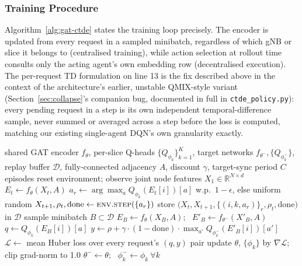 \documentclass[journal]{IEEEtran}
\begin{document}
\subsubsection{Training Procedure}
Algorithm~\ref{alg:gat-ctde} states the training loop precisely. The
encoder is updated from every request in a sampled minibatch, regardless
of which gNB or slice it belongs to (centralised training), while
action selection at rollout time consults only the acting agent's own
embedding row (decentralised execution). The per-request TD
formulation on line 13 is the fix described above in the context of the
architecture's earlier, unstable QMIX-style variant
(Section~\ref{sec:collapse}'s companion bug, documented in full in
\texttt{ctde\_policy.py}): every pending request in a step is its own
independent temporal-difference sample, never summed or averaged across
a step before the loss is computed, matching our existing single-agent
DQN's own granularity exactly.

\begin{algorithm}[t]
\caption{GAT-CTDE: centralised training, decentralised execution}
\label{alg:gat-ctde}
\begin{algorithmic}[1]
\REQUIRE shared GAT encoder $f_\theta$, per-slice Q-heads $\{Q_{\phi_k}\}_{k=1}^{K}$, target networks $f_{\theta^-}, \{Q_{\phi_k^-}\}$, replay buffer $\mathcal{D}$, fully-connected adjacency $A$, discount $\gamma$, target-sync period $C$ episodes
  \STATE reset environment; observe joint node features $X_1 \in \mathbb{R}^{N \times d}$
    \STATE $E_t \gets f_\theta(X_t, A)$ 
      \STATE $a_r \gets \arg\max_a Q_{\phi_k}(E_t[i])[a]$ w.p.\ $1{-}\epsilon$, else uniform random 
    \ENDFOR
    \STATE $X_{t+1}, \rho_t, \text{done} \gets \textsc{env.step}(\{a_r\})$
    \STATE store $\big(X_t, X_{t+1}, \{(i,k,a_r)\}_r, \rho_t, \text{done}\big)$ in $\mathcal{D}$
      \STATE sample minibatch $B \subset \mathcal{D}$
      \STATE $E_B \gets f_\theta(X_B, A)$; \ $E'_B \gets f_{\theta^-}(X'_B, A)$ 
        \STATE $q \gets Q_{\phi_k}(E_B[i])[a]$
        \STATE $y \gets \rho + \gamma \cdot (1{-}\text{done}) \cdot \max_{a'} Q_{\phi_k^-}(E'_B[i])[a']$
      \ENDFOR
      \STATE $\mathcal{L} \gets$ mean Huber loss over every request's $(q, y)$ pair 
      \STATE update $\theta$, $\{\phi_k\}$ by $\nabla \mathcal{L}$; clip grad-norm to 1.0
    \ENDIF
  \ENDFOR
    \STATE $\theta^- \gets \theta$; \ $\phi_k^- \gets \phi_k\ \forall k$
  \ENDIF
\ENDFOR
\end{algorithmic}
\end{algorithm}
\end{document}
